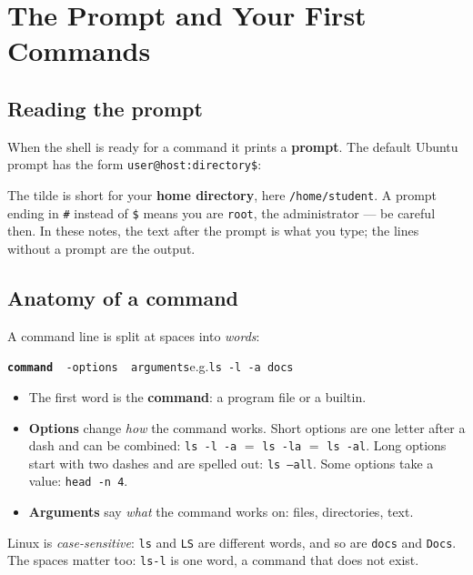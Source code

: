 \documentclass[11pt,a4paper]{article}
\newcommand{\term}[1]{\textbf{\color{mintdeep}#1}}
\newcommand{\cmd}[1]{\texttt{#1}}
\begin{document}
\section{The Prompt and Your First Commands}

\subsection{Reading the prompt}

When the shell is ready for a command it prints a \term{prompt}. The default Ubuntu prompt has the form \texttt{user@host:directory\$}:

\begin{center}
\end{center}

The tilde \texttt{\tl} is short for your \term{home directory}, here \texttt{/home/student}. A prompt ending in \texttt{\#} instead of \texttt{\$} means you are \texttt{root}, the administrator --- be careful then. In these notes, the text after the prompt is what you type; the lines without a prompt are the output.

\subsection{Anatomy of a command}

A command line is split at spaces into \emph{words}:
\begin{center}
\texttt{\textbf{command}\ \ -options\ \ arguments}\qquad e.g.\qquad \texttt{ls -l -a docs}
\end{center}
\begin{itemize}
  \item The first word is the \term{command}: a program file or a builtin.
  \item \term{Options} change \emph{how} the command works. Short options are one letter after a dash and can be combined: \cmd{ls -l -a} $=$ \cmd{ls -la} $=$ \cmd{ls -al}. Long options start with two dashes and are spelled out: \cmd{ls --all}. Some options take a value: \cmd{head -n 4}.
  \item \term{Arguments} say \emph{what} the command works on: files, directories, text.
\end{itemize}
Linux is \emph{case-sensitive}: \cmd{ls} and \cmd{LS} are different words, and so are \texttt{docs} and \texttt{Docs}. The spaces matter too: \cmd{ls-l} is one word, a command that does not exist.
\end{document}
